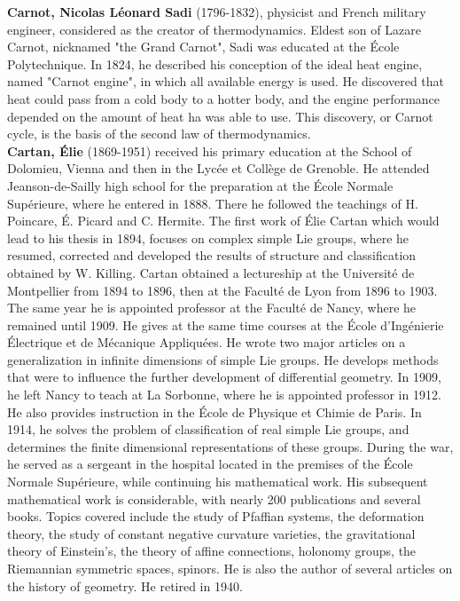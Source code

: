 \textbf{Carnot, Nicolas Léonard Sadi} (1796-1832), physicist and French military engineer, considered as the creator of thermodynamics. Eldest son of Lazare Carnot, nicknamed "the Grand Carnot", Sadi was educated at the École Polytechnique. In 1824, he described his conception of the ideal heat engine, named "Carnot engine", in which all available energy is used. He discovered that heat could pass from a cold body to a hotter body, and the engine performance depended on the amount of heat ha was able to use. This discovery, or Carnot cycle, is the basis of the second law of thermodynamics.\\

\textbf{Cartan, Élie} (1869-1951) received his primary education at the School of Dolomieu, Vienna and then in the Lycée et Collège de Grenoble. He attended Jeanson-de-Sailly high school for the preparation at the École Normale Supérieure, where he entered in 1888. There he followed the teachings of H. Poincare, É. Picard and C. Hermite. The first work of Élie Cartan which would lead to his thesis in 1894, focuses on complex simple Lie groups, where he resumed, corrected and developed the results of structure and classification obtained by W. Killing. Cartan obtained a lectureship at the Université de Montpellier from 1894 to 1896, then at the Faculté de Lyon from 1896 to 1903. The same year he is appointed professor at the Faculté de Nancy, where he remained until 1909. He gives at the same time courses at the École d'Ingénierie Électrique et de Mécanique Appliquées. He wrote two major articles on a generalization in infinite dimensions of simple Lie groups. He develops methods that were to influence the further development of differential geometry. In 1909, he left Nancy to teach at La Sorbonne, where he is appointed professor in 1912. He also provides instruction in the École de Physique et Chimie de Paris. In 1914, he solves the problem of classification of real simple Lie groups, and determines the finite dimensional representations of these groups. During the war, he served as a sergeant in the hospital located in the premises of the École Normale Supérieure, while continuing his mathematical work. His subsequent mathematical work is considerable, with nearly 200 publications and several books. Topics covered include the study of Pfaffian systems, the deformation theory, the study of constant negative curvature varieties, the gravitational theory of Einstein's, the theory of affine connections, holonomy groups, the Riemannian symmetric spaces, spinors. He is also the author of several articles on the history of geometry. He retired in 1940.


